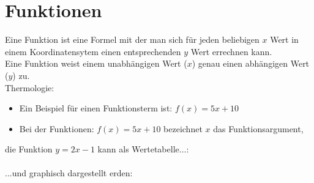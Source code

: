 \newpage
\section{Funktionen}

Eine Funktion ist eine Formel mit der man sich für jeden beliebigen $x$ Wert in einem Koordinatensytem einen entsprechenden $y$ Wert errechnen kann.\\
Eine Funktion weist einem unabhängigen Wert ($x$) genau einen abhängigen Wert ($y$) zu.\\

\hfill \break
Thermologie:\\
\begin{itemize}
    \item Ein Beispiel für einen Funktionsterm ist: $f(x) = 5x+10$
    \item Bei der Funktionen: $f(x) = 5x+10$ bezeichnet $x$ das Funktionsargument,
\end{itemize}

\hfill \break
die Funktion $y=2x-1$ kann als Wertetabelle...:\\
\fboxrule=0.8pt \\

\hfill \break
...und graphisch dargestellt erden:\\

